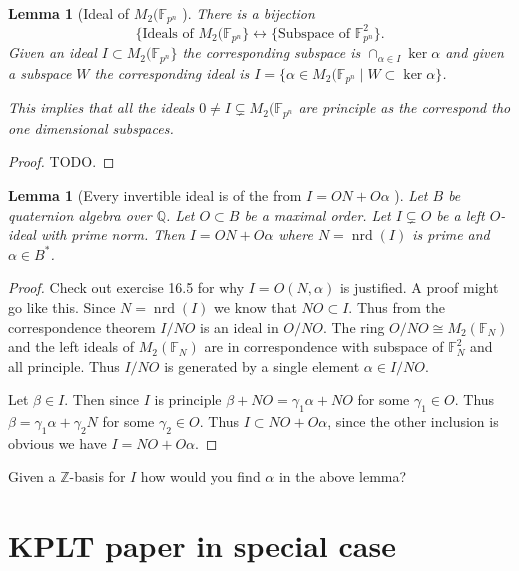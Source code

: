 \documentclass[10pt]{article}
\theoremstyle{plain}
\newtheorem{lemma}[theorem]{Lemma}
\theoremstyle{definition}
\newcommand{\iso}{\cong}
\newcommand{\op}{\operatorname}
\newcommand{\Z}{\mathbb{Z}}
\newcommand{\Q}{\mathbb{Q}}
\newcommand{\F}{\mathbb{F}}
\newcommand{\nrd}{\op{nrd}}
\begin{document}
\begin{lemma}[Ideal of \( M_2(\F_{p^n} \) ]
    There is a bijection
    \[
        \{\text{Ideals of } M_2(\F_{p^n}\} \leftrightarrow \{ \text{Subspace of } \F_{p^n}^2 \}.
    \]
    Given an ideal \( I \subset  M_2(\F_{p^n}\} \) the corresponding subspace is \( \cap_{\alpha \in I} \ker \alpha \) and given a subspace \( W \) the corresponding ideal is \( I = \{\alpha \in M_2(\F_{p^n} \mid W \subset \ker \alpha\} \).

    This implies that all the ideals \( 0 \neq I \subsetneq M_2(\F_{p^n} \) are principle as the correspond tho one dimensional subspaces.
\end{lemma}
\begin{proof}
    TODO.
\end{proof}

\begin{lemma}[Every invertible ideal is of the from \( I = ON + O\alpha \) ]
    Let \( B \) be quaternion algebra over \( \Q \).
    Let \( O \subset B \) be a maximal order.
    Let \( I \subsetneq O \) be a left \( O \)-ideal with prime norm.
    Then \( I = ON + O \alpha \) where \( N = \nrd(I) \) is prime and \( \alpha \in B^* \).
\end{lemma}
\begin{proof}
    {\color{red} Check out exercise 16.5 for why \( I = O(N, \alpha) \) is justified.}
    A proof might go like this.
    Since \( N = \nrd(I) \) we know that \( NO \subset I \).
    Thus from the correspondence theorem \( I / NO \) is an ideal in \( O / NO \).
    The ring \( O / NO \iso M_2(\F_N) \) and the left ideals of \( M_2(\F_N) \) are in correspondence with subspace of \( \F_N^2 \) and all principle.
    Thus \( I / NO \) is generated by a single element \( \alpha \in I / NO \).

    Let \( \beta \in I \).
    Then since \( I \) is principle \( \beta + NO = \gamma_1 \alpha + NO \) for some \( \gamma_1 \in O \).
    Thus \( \beta = \gamma_1\alpha + \gamma_2N \) for some \( \gamma_2 \in O \).
    Thus \( I \subset NO + O\alpha \), since the other inclusion is obvious we have \( I =  NO + O\alpha \).
\end{proof}

{\color{red} Given a \( \Z \)-basis for \( I \) how would you find \( \alpha \) in the above lemma?}

\section{KPLT paper in special case}
\end{document}
